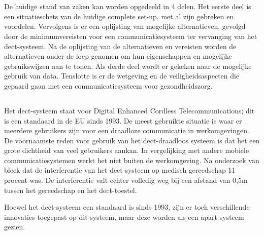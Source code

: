 \chapter{}%
\label{ch:stand-van-zaken}



De huidige stand van zaken kan worden opgedeeld in 4 delen. Het eerste deel is een situatieschets van de huidige complete set-up, met al zijn gebreken en voordelen. Vervolgens is er een oplijsting van mogelijke alternatieven, gevolgd door de minimumvereisten voor een communicatiesysteem ter vervanging van het \gls{dect}-systeem. Na de oplijsting van de alternatieven en vereisten worden de alternatieven onder de loep genomen om hun eigenschappen en mogelijke gebruikswijzen aan te tonen. Als derde deel wordt er gekeken naar de mogelijke gebruik van data. Tenslotte is er de wetgeving en de veiligheidsaspecten die gepaard gaan met een communicatiesysteem voor gezondheidszorg.

\section{}%
\label{sec:dect-systeem}
Het \gls{dect}-systeem staat voor Digital Enhanced Cordless Telecommunications; dit is een standaard in de EU sinds 1993. De meest gebruikte situatie is waar er meerdere gebruikers zijn voor een draadloze communicatie in werkomgevingen. De voornaamste reden voor gebruik van het \gls{dect}-draadloos systeem is dat het een grote dichtheid van veel gebruikers aankan. In vergelijking met andere mobiele communicatiesystemen werkt het niet buiten de werkomgeving. \autocite{Welinder1997} Na onderzoek van \textcite{Welinder1997} bleek dat de interferentie van het \gls{dect}-systeem op medisch gereedschap 11 procent was. De interferentie valt echter volledig weg bij een afstand van 0,5m tussen het gereedschap en het \gls{dect}-toestel.


Hoewel het \gls{dect}-systeem een standaard is sinds 1993, zijn er toch verschillende innovaties toegepast op dit systeem, maar deze worden als een apart systeem gezien. 

